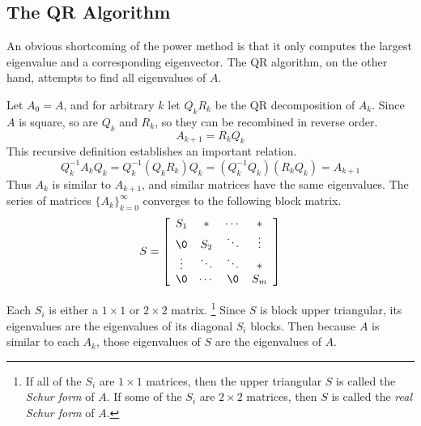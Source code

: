 \subsection*{The QR Algorithm} %

An obvious shortcoming of the power method is that it only computes the largest eigenvalue and a corresponding eigenvector.
The QR algorithm, on the other hand, attempts to find all eigenvalues of $A$.

Let $A_0 = A$, and for arbitrary $k$ let $Q_kR_k$ be the QR decomposition of $A_k$.
Since $A$ is square, so are $Q_k$ and $R_k$, so they can be recombined in reverse order.
\[A_{k+1}=R_kQ_k\]
This recursive definition establishes an important relation.
\[Q_k^{-1}A_kQ_k = Q_k^{-1}(Q_kR_k)Q_k = (Q_k^{-1}Q_k)(R_kQ_k) = A_{k+1}\]
Thus $A_k$ is similar to $A_{k+1}$, and similar matrices have the same eigenvalues.
The series of matrices $\{A_k\}_{k=0}^\infty$ converges to the following block matrix.
\[
S =
\left[\begin{array}{cccc}
S_1    & *      & \cdots & *      \\
\0     & S_2    & \ddots & \vdots \\
\vdots & \ddots & \ddots & *      \\
\0     & \cdots &     \0 & S_m
\end{array}\right]
\]

Each $S_i$ is either a $1\times1$ or $2\times2$ matrix.%
\footnote{If all of the $S_i$ are $1\times1$ matrices, then the upper triangular $S$ is called the \emph{Schur form} of $A$.
If some of the $S_i$ are $2\times2$ matrices, then $S$ is called the \emph{real Schur form} of $A$.}
Since $S$ is block upper triangular, its eigenvalues are the eigenvalues of its diagonal $S_i$ blocks.
Then because $A$ is similar to each $A_k$, those eigenvalues of $S$ are the eigenvalues of $A$.

